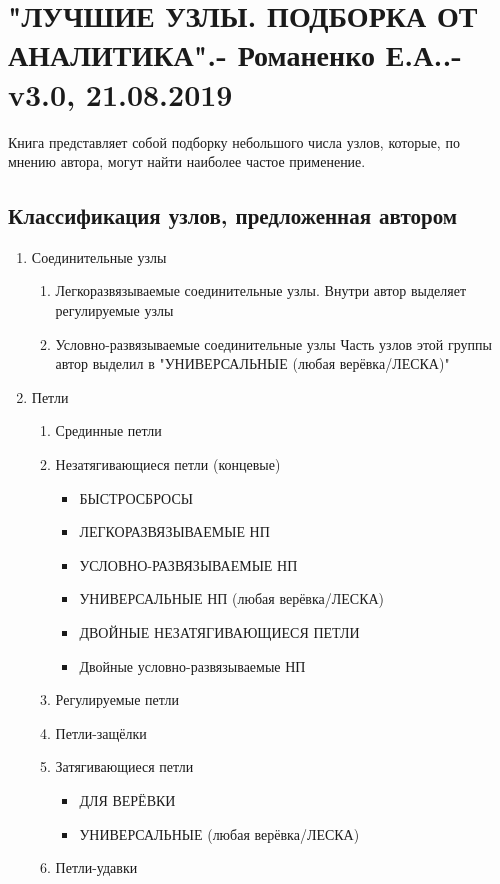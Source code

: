 \section{"ЛУЧШИЕ УЗЛЫ. ПОДБОРКА ОТ АНАЛИТИКА".- Романенко Е.А..- v3.0, 21.08.2019}

Книга представляет собой подборку небольшого числа узлов, которые, по мнению автора, могут найти наиболее частое применение.

\graphicspath{{\currentpath}}

\subsection{Классификация узлов, предложенная автором}

\begin{enumerate}
\item Соединительные узлы
\begin{enumerate}
\item Легкоразвязываемые соединительные узлы.
Внутри автор выделяет регулируемые узлы
\item Условно-развязываемые соединительные узлы
Часть узлов этой группы автор выделил в "УНИВЕРСАЛЬНЫЕ (любая верёвка/ЛЕСКА)"
\end{enumerate}
\item Петли
\begin{enumerate}
\item Срединные петли
\item Незатягивающиеся петли (концевые)
\begin{itemize}
\item БЫСТРОСБРОСЫ
\item ЛЕГКОРАЗВЯЗЫВАЕМЫЕ НП
\item УСЛОВНО-РАЗВЯЗЫВАЕМЫЕ НП
\item УНИВЕРСАЛЬНЫЕ НП (любая верёвка/ЛЕСКА)
\item ДВОЙНЫЕ НЕЗАТЯГИВАЮЩИЕСЯ ПЕТЛИ
\item Двойные условно-развязываемые НП
\end{itemize}
\item Регулируемые петли
\item Петли-защёлки
\item Затягивающиеся петли
\begin{itemize}
\item ДЛЯ ВЕРЁВКИ
\item УНИВЕРСАЛЬНЫЕ (любая верёвка/ЛЕСКА)
\end{itemize}
\item Петли-удавки

\end{enumerate}
\end{enumerate}
